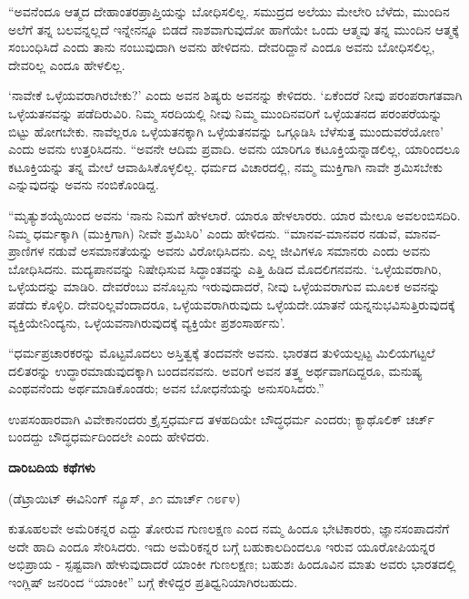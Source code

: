 “ಅವನೆಂದೂ ಆತ್ಮದ ದೇಹಾಂತರಪ್ರಾಪ್ತಿಯನ್ನು ಬೋಧಿಸಲಿಲ್ಲ. ಸಮುದ್ರದ ಅಲೆಯು ಮೇಲೇರಿ ಬೆಳೆದು, ಮುಂದಿನ ಅಲೆಗೆ ತನ್ನ ಬಲವನ್ನಲ್ಲದೆ ಇನ್ನೇನನ್ನೂ ಬಿಡದೆ ನಾಶವಾಗುವುದೋ ಹಾಗೆಯೇ ಒಂದು ಆತ್ಮವು ತನ್ನ ಮುಂದಿನ ಆತ್ಮಕ್ಕೆ ಸಂಬಂಧಿಸಿದೆ ಎಂದು ತಾನು ನಂಬುವುದಾಗಿ ಅವನು ಹೇಳಿದನು. ದೇವರಿದ್ದಾನೆ ಎಂದೂ ಅವನು ಬೋಧಿಸಲಿಲ್ಲ, ದೇವರಿಲ್ಲ ಎಂದೂ ಹೇಳಲಿಲ್ಲ.

‘ನಾವೇಕೆ ಒಳ್ಳೆಯವರಾಗಿರಬೇಕು?’ ಎಂದು ಅವನ ಶಿಷ್ಯರು ಅವನನ್ನು ಕೇಳಿದರು. ‘ಏಕೆಂದರೆ ನೀವು ಪರಂಪರಾಗತವಾಗಿ ಒಳ್ಳೆಯತನವನ್ನು ಪಡೆದಿರುವಿರಿ. ನಿಮ್ಮ ಸರದಿಯಲ್ಲಿ ನೀವು ನಿಮ್ಮ ಮುಂದಿನವರಿಗೆ ಒಳ್ಳೆಯತನದ ಪರಂಪರೆಯನ್ನು ಬಿಟ್ಟು ಹೋಗಬೇಕು. ನಾವೆಲ್ಲರೂ ಒಳ್ಳೆಯತನಕ್ಕಾಗಿ ಒಳ್ಳೆಯತನವನ್ನು ಒಗ್ಗೂಡಿಸಿ ಬೆಳೆಸುತ್ತ ಮುಂದುವರೆಯೋಣ’ ಎಂದು ಅವನು ಉತ್ತರಿಸಿದನು. “ಅವನೇ ಆದಿಮ ಪ್ರವಾದಿ. ಅವನು ಯಾರಿಗೂ ಕಟೂಕ್ತಿಯನ್ನಾಡಲಿಲ್ಲ, ಯಾರಿಂದಲೂ ಕಟೂಕ್ತಿಯನ್ನು ತನ್ನ ಮೇಲೆ ಆವಾಹಿಸಿಕೊಳ್ಳಲಿಲ್ಲ. ಧರ್ಮದ ವಿಚಾರದಲ್ಲಿ, ನಮ್ಮ ಮುಕ್ತಿಗಾಗಿ ನಾವೇ ಶ್ರಮಿಸಬೇಕು ಎನ್ನುವುದನ್ನು ಅವನು ನಂಬಿಕೊಂಡಿದ್ದ.

“ಮೃತ್ಯುಶಯ್ಯೆಯಿಂದ ಅವನು ‘ನಾನು ನಿಮಗೆ ಹೇಳಲಾರೆ. ಯಾರೂ ಹೇಳಲಾರರು. ಯಾರ ಮೇಲೂ ಅವಲಂಬಿಸದಿರಿ. ನಿಮ್ಮ ಧರ್ಮಕ್ಕಾಗಿ (ಮುಕ್ತಿಗಾಗಿ) ನೀವೇ ಶ್ರಮಿಸಿರಿ’ ಎಂದು ಹೇಳಿದನು. “ಮಾನವ-ಮಾನವರ ನಡುವೆ, ಮಾನವ-ಪ್ರಾಣಿಗಳ ನಡುವೆ ಅಸಮಾನತೆಯನ್ನು ಅವನು ವಿರೋಧಿಸಿದನು. ಎಲ್ಲ ಜೀವಿಗಳೂ ಸಮಾನರು ಎಂದು ಅವನು ಬೋಧಿಸಿದನು. ಮದ್ಯಪಾನವನ್ನು ನಿಷೇಧಿಸುವ ಸಿದ್ಧಾಂತವನ್ನು ಎತ್ತಿ ಹಿಡಿದ ಮೊದಲಿಗನವನು. ‘ಒಳ್ಳೆಯವರಾಗಿರಿ, ಒಳ್ಳೆಯದನ್ನು ಮಾಡಿರಿ. ದೇವರೆಂಬು ವನೊಬ್ಬನು ಇರುವುದಾದರೆ, ನೀವು ಒಳ್ಳೆಯವರಾಗುವ ಮೂಲಕ ಅವನನ್ನು ಪಡೆದು ಕೊಳ್ಳಿರಿ. ದೇವರಿಲ್ಲವೆಂದಾದರೂ, ಒಳ್ಳೆಯವರಾಗಿರುವುದು ಒಳ್ಳೆಯದೇ.ಯಾತನೆ ಯನ್ನನುಭವಿಸುತ್ತಿರುವುದಕ್ಕೆ ವ್ಯಕ್ತಿಯೇನಿಂದ್ಯನು, ಒಳ್ಳೆಯವನಾಗಿರುವುದಕ್ಕೆ ವ್ಯಕ್ತಿಯೇ ಪ್ರಶಂಸಾರ್ಹನು’.

“ಧರ್ಮಪ್ರಚಾರಕರನ್ನು ಮೊಟ್ಟಮೊದಲು ಅಸ್ತಿತ್ವಕ್ಕೆ ತಂದವನೇ ಅವನು. ಭಾರತದ ತುಳಿಯಲ್ಪಟ್ಟ ಮಿಲಿಯಗಟ್ಟಲೆ ದಲಿತರನ್ನು ಉದ್ಧಾರಮಾಡುವುದಕ್ಕಾಗಿ ಬಂದವನವನು. ಅವರಿಗೆ ಅವನ ತತ್ತ್ವ ಅರ್ಥವಾಗದಿದ್ದರೂ, ಮನುಷ್ಯ ಎಂಥವನೆಂದು ಅರ್ಥಮಾಡಿಕೊಂಡರು; ಅವನ ಬೋಧನೆಯನ್ನು ಅನುಸರಿಸಿದರು.”

ಉಪಸಂಹಾರವಾಗಿ ವಿವೇಕಾನಂದರು ಕ್ರೈಸ್ತಧರ್ಮದ ತಳಹದಿಯೇ ಬೌದ್ಧಧರ್ಮ ಎಂದರು; ಕ್ಯಾಥೊಲಿಕ್ ಚರ್ಚ್ ಬಂದದ್ದು ಬೌದ್ಧಧರ್ಮದಿಂದಲೇ ಎಂದು ಹೇಳಿದರು.

\begin{center}
\textbf{ದಾರಿಬದಿಯ ಕಥೆಗಳು}
\end{center}

\begin{center}
(ಡೆಟ್ರಾಯಿಟ್ ಈವಿನಿಂಗ್ ನ್ಯೂಸ್, ೨೧ ಮಾರ್ಚ್ ೧೮೯೪)
\end{center}

ಕುತೂಹಲವೇ ಅಮೆರಿಕನ್ನರ ಎದ್ದು ತೋರುವ ಗುಣಲಕ್ಷಣ ಎಂದ ನಮ್ಮ ಹಿಂದೂ ಭೇಟಿಕಾರರು, ಜ್ಞಾನಸಂಪಾದನೆಗೆ ಅದೇ ಹಾದಿ ಎಂದೂ ಸೇರಿಸಿದರು. ಇದು ಅಮೆರಿಕನ್ನರ ಬಗ್ಗೆ ಬಹುಕಾಲದಿಂದಲೂ ಇರುವ ಯೂರೋಪಿಯನ್ನರ ಅಭಿಪ್ರಾಯ - ಸ್ಪಷ್ಟವಾಗಿ ಹೇಳುವುದಾದರೆ ಯಾಂಕೀ ಗುಣಲಕ್ಷಣ; ಬಹುಶಃ ಹಿಂದೂವಿನ ಮಾತು ಅವರು ಭಾರತದಲ್ಲಿ ಇಂಗ್ಲಿಷ್ ಜನರಿಂದ “ಯಾಂಕೀ” ಬಗ್ಗೆ ಕೇಳಿದ್ದರ ಪ್ರತಿಧ್ವನಿಯಾಗಿರಬಹುದು.

